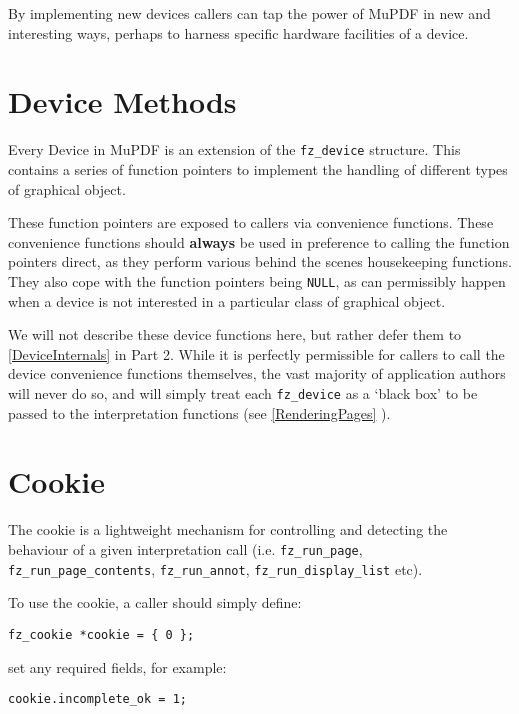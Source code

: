 \documentclass[oneside]{book}
\newcommand{\rjwref}[1] {\autoref{#1} \nameref{#1}}
\begin{document}
By implementing new devices callers can tap the power of MuPDF in new and interesting ways, perhaps to harness specific hardware facilities of a device.

\section{Device Methods}

Every Device in MuPDF is an extension of the \texttt{fz\_device} structure. This contains a series of function pointers to implement the handling of different types of graphical object.

These function pointers are exposed to callers via convenience functions. These convenience functions should \textbf{always} be used in preference to calling the function pointers direct, as they perform various behind the scenes housekeeping functions. They also cope with the function pointers being \texttt{NULL}, as can permissibly happen when a device is not interested in a particular class of graphical object.

We will not describe these device functions here, but rather defer them to \rjwref{DeviceInternals} in Part 2. While it is perfectly permissible for callers to call the device convenience functions themselves, the vast majority of application authors will never do so, and will simply treat each \texttt{fz\_device} as a `black box' to be passed to the interpretation functions (see \rjwref{RenderingPages}).

\section{Cookie}
\label{Cookie}

The cookie is a lightweight mechanism for controlling and detecting the behaviour of a given interpretation call (i.e. \texttt{fz\_run\_page}, \texttt{fz\_run\_page\_contents},  \texttt{fz\_run\_annot}, \texttt{fz\_run\_display\_list} etc).

To use the cookie, a caller should simply define:

\begin{lstlisting}
fz_cookie *cookie = { 0 };
\end{lstlisting}

set any required fields, for example:

\begin{lstlisting}
cookie.incomplete_ok = 1;
\end{lstlisting}
\end{document}
